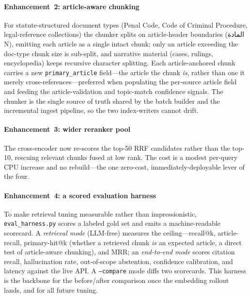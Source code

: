 \documentclass[final,1p,times]{elsarticle}
\newcommand{\ar}[1]{{\arabicfont\beginR #1\endR}}
\begin{document}
\paragraph{Enhancement~2: article-aware chunking} For statute-structured document
types (Penal Code, Code of Criminal Procedure, legal-reference collections) the
chunker splits on article-header boundaries (\ar{المادة N}), emitting each article
as a single intact chunk; only an article exceeding the doc-type chunk size is
sub-split, and narrative material (cases, rulings, encyclopedia) keeps recursive
character splitting. Each article-anchored chunk carries a new
\texttt{primary\_article} field---the article the chunk \emph{is}, rather than one
it merely cross-references---preferred when populating the per-source article field
and feeding the article-validation and topic-match confidence signals. The chunker
is the single source of truth shared by the batch builder and the incremental
ingest pipeline, so the two index-writers cannot drift.

\paragraph{Enhancement~3: wider reranker pool} The cross-encoder now re-scores the
top-50 RRF candidates rather than the top-10, rescuing relevant chunks fused at low
rank. The cost is a modest per-query CPU increase and no rebuild---the one
zero-cost, immediately-deployable lever of the four.

\paragraph{Enhancement~4: a scored evaluation harness} To make retrieval tuning
measurable rather than impressionistic, \texttt{eval\_harness.py} scores a labeled
gold set and emits a machine-readable scorecard. A \emph{retrieval mode} (LLM-free)
measures the ceiling---recall@k, article-recall, primary-hit@k (whether a retrieved
chunk \emph{is} an expected article, a direct test of article-aware chunking), and
MRR; an \emph{end-to-end mode} scores citation recall, hallucination rate,
out-of-scope abstention, confidence calibration, and latency against the live API.
A \texttt{--compare} mode diffs two scorecards. This harness is the backbone for
the before/after comparison once the embedding rollout lands, and for all future
tuning.
\end{document}
